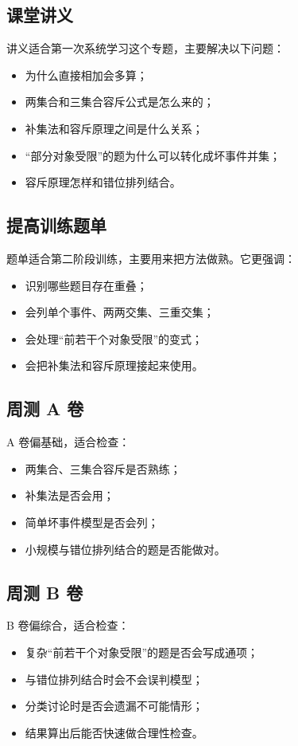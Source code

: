 \documentclass[11pt,a4paper,fontset=fandol]{ctexart}
\begin{document}
\subsection{课堂讲义}
讲义适合第一次系统学习这个专题，主要解决以下问题：
\begin{itemize}
  \item 为什么直接相加会多算；
  \item 两集合和三集合容斥公式是怎么来的；
  \item 补集法和容斥原理之间是什么关系；
  \item “部分对象受限”的题为什么可以转化成坏事件并集；
  \item 容斥原理怎样和错位排列结合。
\end{itemize}

\subsection{提高训练题单}
题单适合第二阶段训练，主要用来把方法做熟。它更强调：
\begin{itemize}
  \item 识别哪些题目存在重叠；
  \item 会列单个事件、两两交集、三重交集；
  \item 会处理“前若干个对象受限”的变式；
  \item 会把补集法和容斥原理接起来使用。
\end{itemize}

\subsection{周测 A 卷}
A 卷偏基础，适合检查：
\begin{itemize}
  \item 两集合、三集合容斥是否熟练；
  \item 补集法是否会用；
  \item 简单坏事件模型是否会列；
  \item 小规模与错位排列结合的题是否能做对。
\end{itemize}

\subsection{周测 B 卷}
B 卷偏综合，适合检查：
\begin{itemize}
  \item 复杂“前若干个对象受限”的题是否会写成通项；
  \item 与错位排列结合时会不会误判模型；
  \item 分类讨论时是否会遗漏不可能情形；
  \item 结果算出后能否快速做合理性检查。
\end{itemize}
\end{document}
